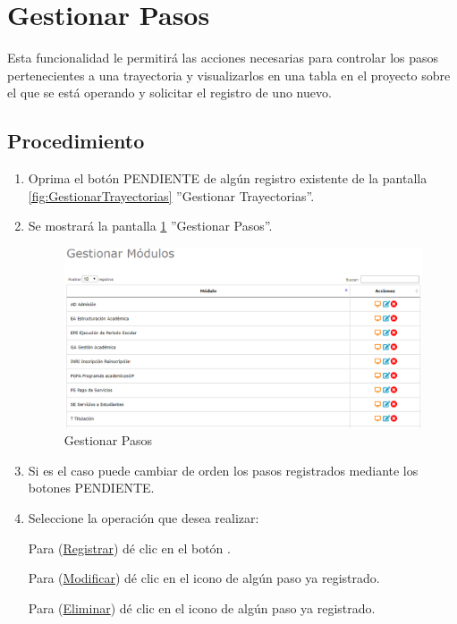 \hypertarget{cv:GestionarPasos}{\section{Gestionar Pasos}} \label{sec:GestionarPasos}

	Esta funcionalidad le permitirá las acciones necesarias para controlar los pasos pertenecientes a una trayectoria y visualizarlos en una tabla en el proyecto sobre el que se está operando y solicitar el registro de uno nuevo.

		\subsection{Procedimiento}

			\begin{enumerate}
			
			\item Oprima el botón PENDIENTE de algún registro existente de la pantalla \ref{fig:GestionarTrayectorias} ''Gestionar Trayectorias''.
	
			\item Se mostrará la pantalla \ref{fig:GestionarPasos} ''Gestionar Pasos''.

			\begin{figure}[htbp!]
				\begin{center}
					\includegraphics[scale=0.6]{roles/lider/casosUso/pantallas/IU5gestionarModulos}
					\caption{Gestionar Pasos}
					\label{fig:GestionarPasos}
				\end{center}
			\end{figure}
		
			\item Si es el caso puede cambiar de orden los pasos registrados mediante los botones PENDIENTE.
		
			\item Seleccione la operación que desea realizar:
			
			Para (\hyperlink{cv:registrarPaso}{Registrar}) dé clic en el botón \IURegistrar.
			
			Para (\hyperlink{cv:modificarPaso}{Modificar}) dé clic en el icono \IUEditar{} de algún paso ya registrado.
			
			Para (\hyperlink{cv:eliminarPaso}{Eliminar}) dé clic en el icono \IUBotonEliminar{} de algún paso ya registrado.
			
			\end{enumerate}